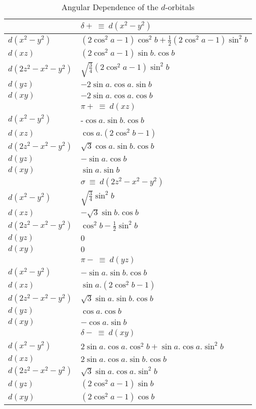 \begin{table}
\caption{\label{d_rot} Angular Dependence of the $d$-orbitals}
\begin{tabular}{|l|l|}\hline
 & $\delta + \ \equiv \ d(x^2-y^2)$ \\ \hline
$d(x^2-y^2)$ & $(2\cos^2a-1) \cos^2b+\frac{1}{2}(2\cos^2a-1) \sin^2b $ \\
$d(xz)$ & $(2\cos^2a-1) \sin b.\cos b$ \\
$d(2z^2-x^2-y^2) $ & $\sqrt{\frac{3}{4}}(2\cos^2a-1) \sin^2b$ \\
$d(yz)$ & $-2\sin a.\cos a. \sin b $ \\
$d(xy)$ & $-2\sin a.\cos a. \cos b $ \\ \hline
%
  & $\pi + \ \equiv \ d(xz) $ \\\hline
$d(x^2-y^2) $ &-$\cos a. \sin b.\cos b$ \\
$d(xz) $ & $\cos a. (2\cos^2b-1)$ \\
$d(2z^2-x^2-y^2) $ & $\sqrt{3}\cos a. \sin b.\cos b$ \\
$d(yz)$ & $-\sin a. \cos b$ \\
$d(xy)$ & $\sin a . \sin b$ \\  \hline
  & $\sigma  \ \equiv \ d(2z^2-x^2-y^2) $ \\\hline
$d(x^2-y^2) $ & $\sqrt{\frac{3}{4}}\sin^2b$ \\
$d(xz) $ & $-\sqrt{3}\sin b.\cos b$ \\
$d(2z^2-x^2-y^2) $ & $\cos^2b-\frac{1}{2}\sin^2b$ \\
$d(yz)$ & $ 0 $ \\
$d(xy)$ & $ 0 $ \\  \hline
  & $\pi -  \ \equiv \ d(yz)$ \\     \hline
$d(x^2-y^2)  $ & $-\sin a. \sin b.\cos b$ \\
$d(xz)  $ & $\sin a. (2\cos^2b-1) $ \\
$d(2z^2-x^2-y^2) $ & $\sqrt{3}\sin a.\sin b.\cos b $ \\
$d(yz)  $ & $\cos a. \cos b $ \\
$d(xy) $ & $-\cos a. \sin b $ \\  \hline
%
  & $\delta -  \ \equiv \ d(xy) $ \\\hline
$d(x^2-y^2) $ &2$\sin a.\cos a. \cos^2b+\sin a.\cos a. \sin^2b$ \\
$d(xz)$ & $2\sin a.\cos a. \sin b.\cos b $ \\
$d(2z^2-x^2-y^2) $ & $\sqrt{3}\sin a.\cos a. \sin^2b $ \\
$d(yz)$ & $(2\cos^2a-1) \sin b $ \\
$d(xy)$ & $(2\cos^2a-1) \cos b $ \\ \hline
\end{tabular}
\end{table}
